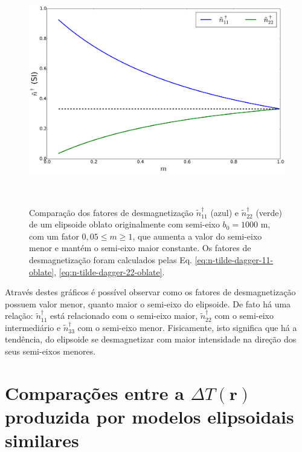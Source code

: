 \begin{figure}[hbt!]
	\centering \includegraphics[width=15cm,height=10cm]{figures/test_n_oblate}
	\caption[Comparação dos fatores de desmagnetização
	$\tilde{n}^{\dagger}_{11}$ (azul) e $\tilde{n}^{\dagger}_{22}$ (verde) de um elipsoide oblato originalmente com semi-eixo $b_0=1000$ m, com um fator $0,05 \le m \ge 1$, que aumenta a valor do semi-eixo menor e mantém o semi-eixo maior constante. Os fatores de desmagnetização foram calculados pelas Eq. \ref{eq:n-tilde-dagger-11-oblate}, \ref{eq:n-tilde-dagger-22-oblate}.]{Comparação dos fatores de desmagnetização
		$\tilde{n}^{\dagger}_{11}$ (azul) e $\tilde{n}^{\dagger}_{22}$ (verde) de um elipsoide oblato originalmente com semi-eixo $b_0=1000$ m, com um fator $0,05 \le m \ge 1$, que aumenta a valor do semi-eixo menor e mantém o semi-eixo maior constante. Os fatores de desmagnetização foram calculados pelas Eq. \ref{eq:n-tilde-dagger-11-oblate}, \ref{eq:n-tilde-dagger-22-oblate}.}
	\label{fig:n_oblato}
\end{figure}

Através destes gráficos é possível observar como os fatores de desmagnetização possuem valor menor, quanto maior o semi-eixo do elipsoide. De fato há uma relação: $\tilde{n}^{\dagger}_{11}$ está relacionado com o semi-eixo maior, $\tilde{n}^{\dagger}_{22}$ com o semi-eixo intermediário e $\tilde{n}^{\dagger}_{33}$ com o semi-eixo menor. Fisicamente, isto significa que há a tendência, do elipsoide se desmagnetizar com maior intensidade na direção dos seus semi-eixos menores.

\section{Comparações entre a $\Delta T (\mathbf{r})$ produzida por modelos elipsoidais similares}


